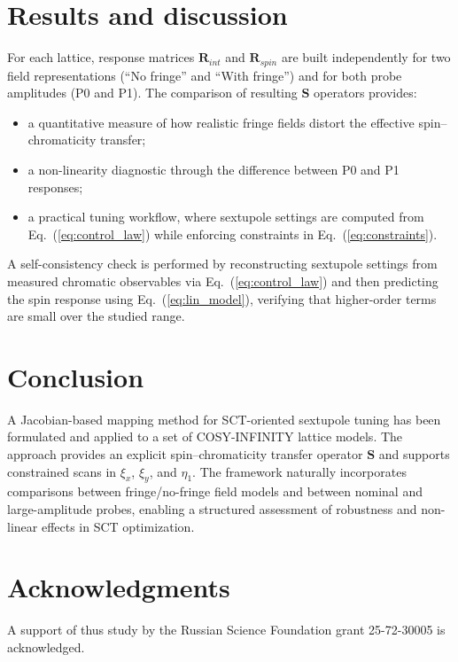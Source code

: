 \documentclass[a4paper,
               keeplastbox,   %
               ]{jacow}
\begin{document}
\section{Results and discussion}
\par For each lattice, response matrices \(\mathbf{R}_{int}\) and \(\mathbf{R}_{spin}\) are built independently for two field representations (``No fringe'' and ``With fringe'') and for both probe amplitudes (P0 and P1). The comparison of resulting \(\mathbf{S}\) operators provides:
\begin{itemize}
	\item a quantitative measure of how realistic fringe fields distort the effective spin--chromaticity transfer;
	\item a non-linearity diagnostic through the difference between P0 and P1 responses;
	\item a practical tuning workflow, where sextupole settings are computed from Eq.~(\ref{eq:control_law}) while enforcing constraints in Eq.~(\ref{eq:constraints}).
\end{itemize}
\par A self-consistency check is performed by reconstructing sextupole settings from measured chromatic observables via Eq.~(\ref{eq:control_law}) and then predicting the spin response using Eq.~(\ref{eq:lin_model}), verifying that higher-order terms are small over the studied range.

\section{Conclusion}
\par A Jacobian-based mapping method for SCT-oriented sextupole tuning has been formulated and applied to a set of COSY-INFINITY lattice models. The approach provides an explicit spin--chromaticity transfer operator \(\mathbf{S}\) and supports constrained scans in \(\xi_x\), \(\xi_y\), and \(\eta_1\). The framework naturally incorporates comparisons between fringe/no-fringe field models and between nominal and large-amplitude probes, enabling a structured assessment of robustness and non-linear effects in SCT optimization.

\section{Acknowledgments}

\par A support of thus study by the Russian Science Foundation grant 25-72-30005 is acknowledged.
\end{document}
